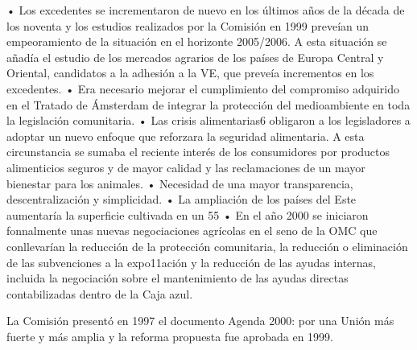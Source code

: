 \documentclass[10pt,a4paper]{article}
\begin{document}
• Los excedentes se incrementaron de nuevo en los últimos años de la década de los noventa y los estudios realizados por la Comisión en 1999 preveían un empeoramiento de la  situación en el horizonte 2005/2006. A esta situación se añadía el estudio de los mercados agrarios de los países de Europa Central y Oriental, candidatos a la adhesión a la VE, que preveía incrementos en los excedentes.
• Era necesario mejorar el cumplimiento del compromiso adquirido en el Tratado de Ámsterdam de integrar la protección del medioambiente en toda la legislación comunitaria.
• Las crisis alimentarias6 obligaron a los legisladores a adoptar un nuevo enfoque que reforzara la seguridad alimentaria. A esta circunstancia se sumaba el reciente interés de los consumidores por productos alimenticios seguros y de mayor calidad y las reclamaciones de un mayor bienestar para los animales.
• Necesidad de una mayor transparencia, descentralización y simplicidad.
• La ampliación de los países del Este aumentaría la superficie cultivada en un 55%
• En el año 2000 se iniciaron fonnalmente unas nuevas negociaciones agrícolas en el seno de la OMC que conllevarían la reducción de la protección comunitaria, la reducción o eliminación de las subvenciones a la expo11ación y la reducción de las ayudas internas, incluida la negociación sobre el mantenimiento de las ayudas directas contabilizadas dentro de la Caja azul.

La Comisión presentó en 1997 el documento Agenda 2000: por una Unión más fuerte y más amplia y la reforma propuesta fue aprobada en 1999. 
\end{document}
